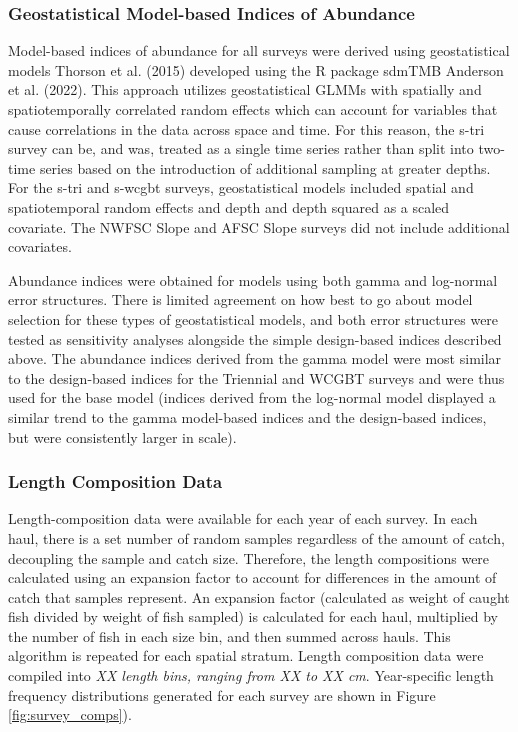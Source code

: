 \documentclass[11pt,
  english,
  letterpaper,
]{article}
\begin{document}
\hypertarget{geostatistical-model-based-indices-of-abundance}{%
\subsubsection{Geostatistical Model-based Indices of Abundance}\label{geostatistical-model-based-indices-of-abundance}}

Model-based indices of abundance for all surveys were derived using geostatistical models Thorson et al. (2015) developed using the R package sdmTMB Anderson et al. (2022). This approach utilizes geostatistical GLMMs with spatially and spatiotemporally correlated random effects which can account for variables that cause correlations in the data across space and time. For this reason, the \gls{s-tri} survey can be, and was, treated as a single time series rather than split into two-time series based on the introduction of additional sampling at greater depths. For the \gls{s-tri} and \gls{s-wcgbt} surveys, geostatistical models included spatial and spatiotemporal random effects and depth and depth squared as a scaled covariate. The NWFSC Slope and AFSC Slope surveys did not include additional covariates.

Abundance indices were obtained for models using both gamma and log-normal error structures. There is limited agreement on how best to go about model selection for these types of geostatistical models, and both error structures were tested as sensitivity analyses alongside the simple design-based indices described above. The abundance indices derived from the gamma model were most similar to the design-based indices for the Triennial and WCGBT surveys and were thus used for the base model (indices derived from the log-normal model displayed a similar trend to the gamma model-based indices and the design-based indices, but were consistently larger in scale).

\hypertarget{length-composition-data}{%
\subsubsection{Length Composition Data}\label{length-composition-data}}

Length-composition data were available for each year of each survey. In each haul, there is a set number of random samples regardless of the amount of catch, decoupling the sample and catch size. Therefore, the length compositions were calculated using an expansion factor to account for differences in the amount of catch that samples represent. An expansion factor (calculated as weight of caught fish divided by weight of fish sampled) is calculated for each haul, multiplied by the number of fish in each size bin, and then summed across hauls. This algorithm is repeated for each spatial stratum. Length composition data were compiled into \emph{XX length bins, ranging from XX to XX cm}. Year-specific length frequency distributions generated for each survey are shown in Figure \ref{fig:survey_comps}).
\end{document}
